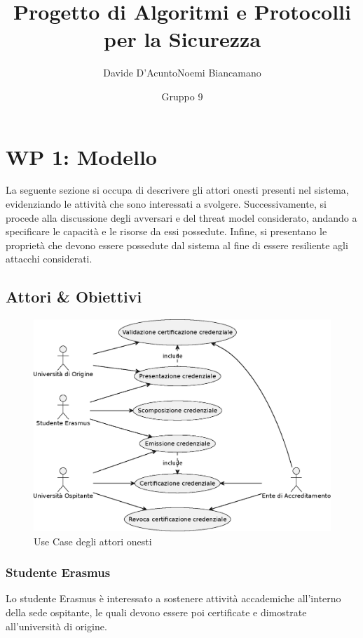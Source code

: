 \documentclass[a4paper,12pt]{article}
\title{Progetto di Algoritmi e Protocolli per la Sicurezza}
\author{Davide D'Acunto\quad Noemi Biancamano}
\date{Gruppo 9}
\begin{document}
\maketitle

\tableofcontents
\newpage
\section{WP 1: Modello}
La seguente sezione si occupa di descrivere gli attori onesti presenti nel sistema, evidenziando le attività che sono interessati a svolgere.
\newline Successivamente, si procede alla discussione degli avversari e del threat model considerato, andando a specificare le capacità e le risorse da essi possedute. Infine, si presentano le proprietà che devono essere possedute dal sistema al fine di essere resiliente agli attacchi considerati.
\subsection{Attori \& Obiettivi}
\begin{figure}[H]
    \centering
    \includegraphics[width=\textwidth]{usecase_1.eps}
    \caption{Use Case degli attori onesti}
    \label{fig:usecase1}
\end{figure}
\subsubsection{Studente Erasmus}
Lo studente Erasmus è interessato a sostenere attività accademiche all'interno della sede ospitante, le quali devono essere poi certificate e dimostrate all'università di origine.
\end{document}
